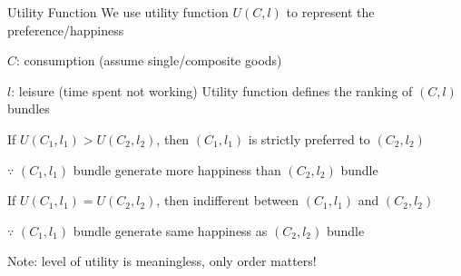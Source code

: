 \documentclass[11pt,aspectratio=169,usenames,dvipsnames]{beamer}
\let\tempone\itemize
\let\temptwo\enditemize
\renewenvironment{itemize}{\tempone\addtolength{\itemsep}{\fill}}{\temptwo}
\begin{document}
\begin{frame}{Utility Function}
\label{slide:Utility_Function}
    We use utility function $ U( C, l ) $ to represent the \alert{preference/happiness}
    \begin{itemize}
        \item $ C $: consumption (assume single/composite goods)
        \item $ l $: leisure (time spent not working)
    \end{itemize}
    Utility function defines the \alert{ranking} of \alert{$(C, l)$ bundles}
    \begin{itemize}
        \item If $ U( C_{1}, l_{1} ) > U( C_{2}, l_{2} ) $, then $ ( C_{1}, l_{1} ) $ is \alert{strictly preferred} to $ ( C_{2}, l_{2} ) $
        \begin{itemize}
            \item $ \because $ $( C_{1}, l_{1} ) $ bundle generate \alert{more} happiness than $ ( C_{2}, l_{2} ) $ bundle
        \end{itemize}
        \item If $ U( C_{1}, l_{1} ) = U( C_{2}, l_{2} ) $, then \alert{indifferent} between $ ( C_{1}, l_{1} ) $ and $ ( C_{2}, l_{2} ) $
        \begin{itemize}
            \item $ \because $ $( C_{1}, l_{1} ) $ bundle generate \alert{same} happiness as $ ( C_{2}, l_{2} ) $ bundle
        \end{itemize}
        \item Note: \alert{level} of utility is meaningless, only \alert{order} matters!
    \end{itemize}
\end{frame}
\end{document}
